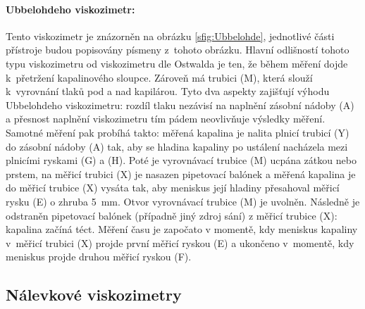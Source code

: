 \documentclass[12pt]{article}
\begin{document}
\paragraph{Ubbelohdeho viskozimetr:} Tento viskozimetr je znázorněn na obrázku \ref{sfig:Ubbelohde}, jednotlivé části přístroje budou popisovány písmeny z~tohoto obrázku. Hlavní odlišností tohoto typu viskozimetru od viskozimetru dle Ostwalda je ten, že během měření dojde k~přetržení kapalinového sloupce. Zároveň má trubici (M), která slouží k~vyrovnání tlaků pod a nad kapilárou. Tyto dva aspekty zajišťují výhodu Ubbelohdeho viskozimetru: rozdíl tlaku nezávisí na naplnění zásobní nádoby (A) a přesnost naplnění viskozimetru tím pádem neovlivňuje výsledky měření.~\cite{wiki:Ubbelohde_viscometer} Samotné měření pak probíhá takto: měřená kapalina je nalita plnicí trubicí (Y) do zásobní nádoby (A) tak, aby se hladina kapaliny po ustálení nacházela mezi plnicími ryskami (G) a (H). Poté je vyrovnávací trubice (M) ucpána zátkou nebo prstem, na měřicí trubici (X) je nasazen pipetovací balónek a měřená kapalina je do měřicí trubice (X) vysáta tak, aby meniskus její hladiny přesahoval měřicí rysku (E) o zhruba \SI{5}{\milli\metre}. Otvor vyrovnávací trubice (M) je uvolněn. Následně je odstraněn pipetovací balónek (případně jiný zdroj sání) z měřicí trubice (X): kapalina začíná téct. Měření času je započato v momentě, kdy meniskus kapaliny v~měřicí trubici (X) projde první měřicí ryskou (E) a ukončeno v~momentě, kdy meniskus projde druhou měřicí ryskou (F).~\cite{book:Calibration_of_viscometers}

\subsection{Nálevkové viskozimetry}%
\end{document}
